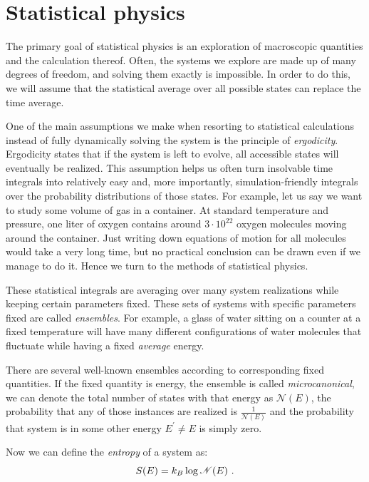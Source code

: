\section{Statistical physics}
\label{sec:statPhys}
The primary goal of statistical physics is an exploration of macroscopic quantities and the calculation thereof. Often, the systems we explore are made up of many degrees of freedom, and solving them exactly is impossible. In order to do this, we will assume that the statistical average over all possible states can replace the time average. 
\par 
One of the main assumptions we make when resorting to statistical calculations instead of fully dynamically solving the system is the principle of \textit{ergodicity}. Ergodicity states that if the system is left to evolve, all accessible states will eventually be realized. This assumption helps us often turn insolvable time integrals into relatively easy and, more importantly, simulation-friendly integrals over the probability distributions of those states. For example, let us say we want to study some volume of gas in a container. At standard temperature and pressure, one liter of oxygen contains around $3\cdot 10^{22}$ oxygen molecules moving around the container. Just writing down equations of motion for all molecules would take a very long time, but no practical conclusion can be drawn even if we manage to do it. Hence we turn to the methods of statistical physics.
\par
These statistical integrals are averaging over many system realizations while keeping certain parameters fixed. These sets of systems with specific parameters fixed are called \textit{ensembles}. For example, a glass of water sitting on a counter at a fixed temperature will have many different configurations of water molecules that fluctuate while having a fixed \textit{average} energy.
\par
There are several well-known ensembles according to corresponding fixed quantities. If the fixed quantity is energy, the ensemble is called \textit{microcanonical}, we can denote the total number of states with that energy as $\mathcal{N}(E)$, the probability that any of those instances are realized is $\frac{1}{\mathcal{N}(E)}$ and the probability that system is in some other energy $E^\prime \neq E$ is simply zero.
\par
Now we can define the \textit{entropy} of a system as:
\begin{equation}
	S(E) = k_B \log \mathcal{N}(E) \ .
\end{equation}
